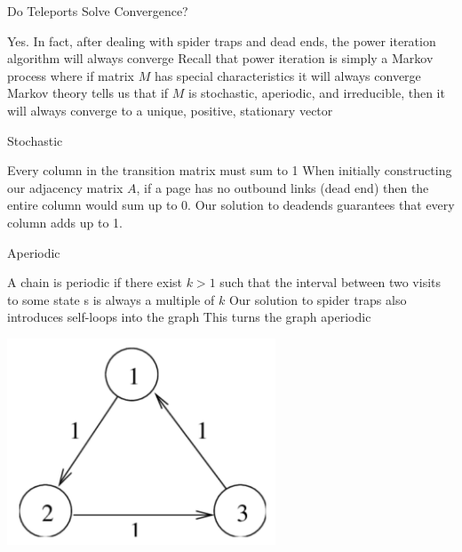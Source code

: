 \documentclass{beamer}
\begin{document}
\begin{frame}[t]{Do Teleports Solve Convergence?}
\begin{outline}
\1 Yes. In fact, after dealing with spider traps and dead ends, the power iteration algorithm will always converge
\1 Recall that power iteration is simply a Markov process where if matrix $M$ has special characteristics it will always converge
\1 Markov theory tells us that if $M$ is stochastic, aperiodic, and irreducible, then it will always converge to a unique, positive, stationary vector
\end{outline}
\end{frame}
   
\begin{frame}[t]{Stochastic}
\begin{outline}
    \1 Every column in the transition matrix must sum to 1
    \1 When initially constructing our adjacency matrix $A$, if a page has no outbound links (dead end) then the entire column would sum up to 0.
    \1 Our solution to deadends guarantees that every column adds up to 1.
\end{outline}
\end{frame}

\begin{frame}[t]{Aperiodic}
\begin{outline}
    \1 A chain is periodic if there exist $k > 1$ such that the interval between two visits to some state s is always a multiple of $k$
    \1 Our solution to spider traps also introduces self-loops into the graph 
    \1 This turns the graph aperiodic
    
    \begin{center}
        \includegraphics[width=0.6\textwidth]{aperiodic.png}
    \end{center}

\end{outline}

\end{frame}
\end{document}
